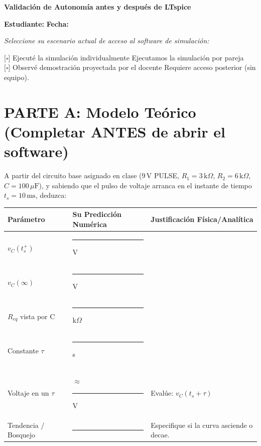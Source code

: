 \documentclass[11pt, a4paper]{article}
\begin{document}
\begin{tcolorbox}[colback=ucbblue!5!white, colframe=ucbblue, title=\textbf{Hoja Individual: Predicción Analítica y Contraste Computacional}]
    \centering \textbf{Validación de Autonomía antes y después de LTspice}
\end{tcolorbox}

\textbf{Estudiante:} \hrulefill \quad \textbf{Fecha:} \hrulefill

\vspace{0.4cm}
\begin{tcolorbox}[colback=gray!5, colframe=gray!50, title=\textbf{Modalidad de Evidencia Tecnológica}]
\textit{Seleccione su escenario actual de acceso al software de simulación:} 

\vspace{0.2cm}
{[$\square$]} Ejecuté la simulación individualmente \quad {[$\square$]} Ejecutamos la simulación por pareja \\[0.2cm]
{[$\square$]} Observé demostración proyectada por el docente \quad {[$\square$]} Requiere acceso posterior (sin equipo).
\end{tcolorbox}

\vspace{0.2cm}
\section*{PARTE A: Modelo Teórico (Completar ANTES de abrir el software)}
A partir del circuito base asignado en clase ($9\,\text{V}$ PULSE, $R_1=3\,\text{k}\Omega$, $R_2=6\,\text{k}\Omega$, $C=100\,\mu\text{F}$), y sabiendo que el pulso de voltaje arranca en el instante de tiempo $t_s = 10\,\text{ms}$, deduzca:

\vspace{0.3cm}
\renewcommand{\arraystretch}{1.5}
\noindent
\begin{tabularx}{\textwidth}{p{3.5cm} >{\centering\arraybackslash}X >{\RaggedRight\arraybackslash}X}
\toprule
\textbf{Parámetro} & \textbf{Su Predicción Numérica} & \textbf{Justificación Física/Analítica} \\ 
\midrule
$v_C(t_s^+)$ & \rule{3cm}{0.4pt} V & \\[0.6cm] 
$v_C(\infty)$ & \rule{3cm}{0.4pt} V & \\[0.6cm] 
$R_{eq}$ vista por C & \rule{3cm}{0.4pt} k$\Omega$ & \\[0.6cm] 
Constante $\tau$ & \rule{3cm}{0.4pt} s & \\[0.6cm] 
Voltaje en un $\tau$ & $\approx$ \rule{2.5cm}{0.4pt} V & Evalúe: $v_C(t_s + \tau)$ \\[0.6cm] 
Tendencia / Bosquejo & \rule{3cm}{0.4pt} & Especifique si la curva asciende o decae. \\[0.2cm] 
\bottomrule
\end{tabularx}
\end{document}
